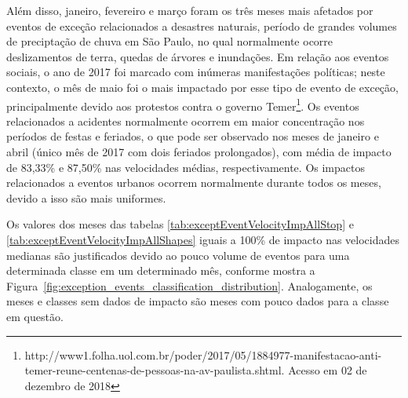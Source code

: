 \documentclass[
	12pt,				%
	oneside,			%
	a4paper,			%
	english,			%
	brazil				%
	]{abntex2ppgsi}
\begin{document}
{{{Além disso, janeiro, fevereiro e março foram os três meses mais afetados por eventos de exceção relacionados a desastres naturais, período de grandes volumes de preciptação de chuva em São Paulo, no qual normalmente ocorre deslizamentos de terra, quedas de árvores e inundações.  Em relação aos eventos sociais, o ano de 2017 foi marcado com inúmeras manifestações políticas; neste contexto, o mês de maio foi o mais impactado por esse tipo de evento de exceção, principalmente devido aos protestos contra o governo Temer\footnote{{http://www1.folha.uol.com.br/poder/2017/05/1884977-manifestacao-anti-temer-reune-centenas-de-pessoas-na-av-paulista.shtml}. Acesso em 02 de dezembro de 2018}. Os eventos relacionados a acidentes normalmente ocorrem em maior concentração nos períodos de festas e feriados, o que pode ser observado nos meses de janeiro e abril (único mês de 2017 com dois feriados prolongados), com média de impacto de 83,33\% e 87,50\% nas velocidades médias, respectivamente.  Os impactos relacionados a eventos urbanos ocorrem normalmente durante todos os meses, devido a isso são mais uniformes.

Os valores dos meses das tabelas \ref{tab:exceptEventVelocityImpAllStop} e \ref{tab:exceptEventVelocityImpAllShapes} iguais a 100\% de impacto nas velocidades medianas são justificados devido ao pouco volume de eventos para uma determinada classe em um determinado mês, conforme mostra a Figura~\ref{fig:exception_events_classification_distribution}. Analogamente, os meses e classes sem dados de impacto são meses com pouco dados para a classe em questão.

}}}
\end{document}
